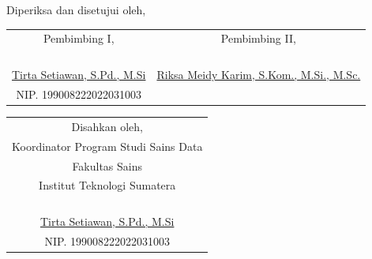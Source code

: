 \begin{center}
	\centering Diperiksa dan disetujui oleh,
	\vspace{2em} %
	\justify
    \setlength{\tabcolsep}{0pt}
    \begin{tabular}{p{}p{}}
        \multicolumn{1}{c}{Pembimbing I,} & \multicolumn{1}{c}{Pembimbing II,} \\
        & \\
        & \\
        & \\
        & \\
		\multicolumn{1}{c}{\underline{Tirta Setiawan, S.Pd., M.Si}} & \multicolumn{1}{c}{\underline{Riksa Meidy Karim, S.Kom., M.Si., M.Sc.}} \\
		\multicolumn{1}{c}{NIP. 199008222022031003} & \multicolumn{1}{c}{} \\
    \end{tabular}
	\vfill

	\centering 
	\begin{tabular}{c}
		Disahkan oleh,\\
		Koordinator Program Studi Sains Data\\
		Fakultas Sains\\
		Institut Teknologi Sumatera
		\\
		\\
		\\
		\\
		\\
		\underline{Tirta Setiawan, S.Pd., M.Si} \\ %
		NIP. 199008222022031003 \\
	\end{tabular}
	
\end{center}
\clearpage
